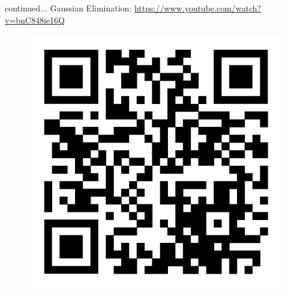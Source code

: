 \documentclass[11pt]{beamer}
\theoremstyle{plain}
\begin{document}
\begin{frame}{continued...}
    Gaussian Elimination: \href{https://www.youtube.com/watch?v=bnC848ie16Q}{https://www.youtube.com/watch?v=bnC848ie16Q}

\begin{figure}[H]
\centering
\includegraphics[scale=0.1]{YT_QR1.png}
\end{figure}
\end{frame}
\end{document}

